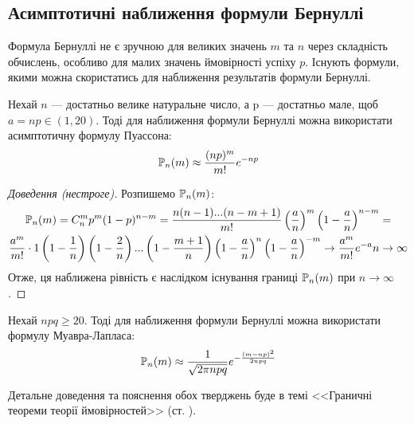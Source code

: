 \subsection{Асимптотичні наближення формули Бернуллі}
Формула Бернуллі не є зручною для великих значень $m$ та $n$ через складність обчислень, особливо для малих значень ймовірності успіху $p$. Існують формули, якими можна 
скористатись для наближення результатів формули Бернуллі.
\begin{proposition*}
    Нехай $n$ --- достатньо велике натуральне число, а p --- достатньо мале, щоб 
    $a = np \in (1, 20)$. Тоді для наближення формули Бернуллі можна використати 
    асимптотичну формулу Пуассона:
    $$\P_n(m) \approx \frac{(np)^m}{m!}e^{-np}$$
\end{proposition*}
\begin{proof}[Доведення (нестроге)] Розпишемо $\P_n(m)$:
    \begin{gather*}
        \P_n(m) = C_n^m p^m (1-p)^{n-m} = \frac{n(n-1)...(n-m+1)}{m!} \left(\frac{a}{n}\right)^m 
        \left(1-\frac{a}{n}\right)^{n-m} = \\
        \frac{a^m}{m!}\cdot 1 \left(1 - \frac{1}{n}\right)\left(1 - \frac{2}{n}\right)
        ...\left(1 - \frac{m+1}{n}\right)\left(1-\frac{a}{n}\right)^n \left(1-\frac{a}{n}\right)^{-m} 
        \to \frac{a^m}{m!}e^{-a} n\to\infty
    \end{gather*}
    Отже, ця наближена рівність є наслідком існування границі $\P_n(m)$ при $n\to\infty$. 
\end{proof}
\begin{proposition*}
    Нехай $npq \geq 20$. Тоді для наближення формули Бернуллі можна використати 
    формулу Муавра-Лапласа:
    $$\P_n(m) \approx \frac{1}{\sqrt{2\pi npq}} e^{-\frac{(m-np)^2}{2npq}}$$
\end{proposition*}
Детальне доведення та пояснення обох тверджень буде в темі <<Граничні теореми теорії ймовірностей>> (ст. \pageref{binom_theorems}).